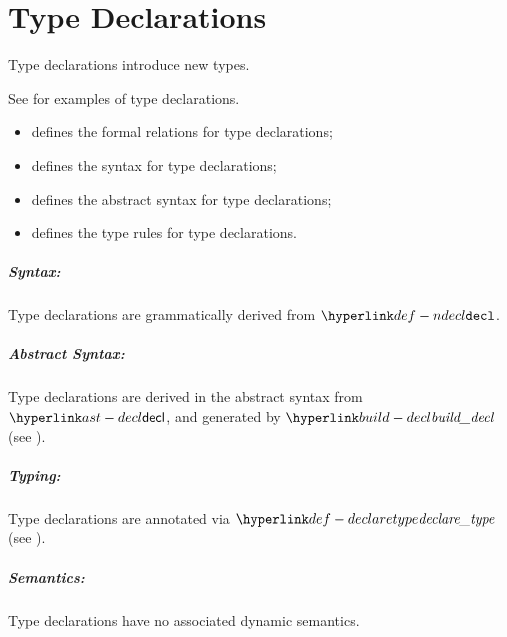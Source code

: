 \chapter{Type Declarations\label{chap:TypeDeclarations}}

Type declarations introduce new types.

See  for examples of type declarations.

\ChapterOutline
\begin{itemize}
  \item {} defines the formal relations for type declarations;
  \item {} defines the syntax for type declarations;
  \item {} defines the abstract syntax for type declarations;
  \item {} defines the type rules for type declarations.
\end{itemize}

\paragraph{Syntax:} Type declarations are grammatically derived from $\Ndecl$.
\paragraph{Abstract Syntax:} Type declarations are derived in the abstract syntax from $\decl$,
  and generated by $\builddecl$ (see ).
\paragraph{Typing:} Type declarations are annotated via $\declaretype$ (see ).
\paragraph{Semantics:} Type declarations have no associated dynamic semantics.

